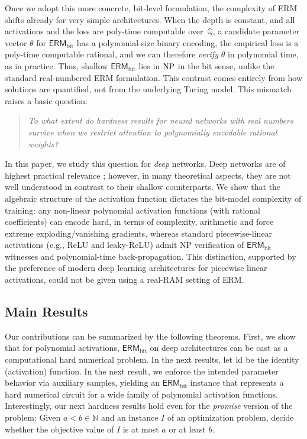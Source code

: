 \documentclass{article}
\newcommand{\id}{\textnormal{id}}
\newcommand{\Q}{\mathbb{Q}}
\theoremstyle{plain}
\theoremstyle{definition}
\theoremstyle{remark}
\begin{document}
Once we adopt this more concrete, bit-level formulation, the complexity of ERM
shifts already for very simple architectures. When the depth is constant, and all
activations and the loss are poly-time computable over~$\Q$, a candidate
parameter vector $\theta$ for $\mathsf{ERM}_{\text{bit}}$ has a polynomial-size
binary encoding, the empirical loss is a poly-time computable rational, and we can therefore \emph{verify} $\theta$ in
polynomial time, as in practice. Thus, shallow $\mathsf{ERM}_{\text{bit}}$ lies in $\textnormal{NP}$ in the bit sense, unlike the standard real-numbered ERM formulation. 
This contrast comes entirely from how solutions are quantified, not from the underlying Turing model.
This mismatch raises a basic question:
\begin{quote}
	\emph{To what extent do hardness results for neural networks with real numbers survive when we restrict attention to polynomially encodable rational weights?}
\end{quote}
In this paper, we study this question for \emph{deep} networks. Deep networks are of highest practical relevance \cite{DBLP:books/daglib/0040158}; however, in many theoretical aspects, they are not well understood  in contrast to their shallow counterparts. We show that the algebraic structure of the activation function dictates the bit-model complexity of training: any non-linear polynomial activation functions (with rational coefficients) can encode hard, in terms of complexity, arithmetic and force extreme exploding/vanishing gradients, whereas standard piecewise-linear activations (e.g., ReLU and leaky-ReLU) admit NP verification of $\mathsf{ERM}_{\text{bit}}$ witnesses and polynomial-time back-propagation. This distinction, supported by the preference of modern deep learning architectures for piecewise linear activations, could not be given using a real-RAM setting of ERM. 

\subsection{Main Results}


Our contributions can be summarized by the following theorems.
First, we show that for polynomial activations, $\mathsf{ERM}_{\text{bit}}$ on deep architectures can be cast as a computational hard numerical problem. 
In the next results, let $\id$ be the identity (activation) function. 
In the next result, we enforce the intended parameter behavior via auxiliary samples, yielding an $\mathsf{ERM}_{\text{bit}}$ instance that represents a hard numerical circuit for a wide family of polynomial activation functions. 
Interestingly, our next hardness results hold even for the {\em promise} version of the problem: Given $a<b \in \mathbb{N}$ and an instance $I$ of an optimization problem, decide whether the objective value of $I$ is at most $a$ or at least $b$.
\end{document}
